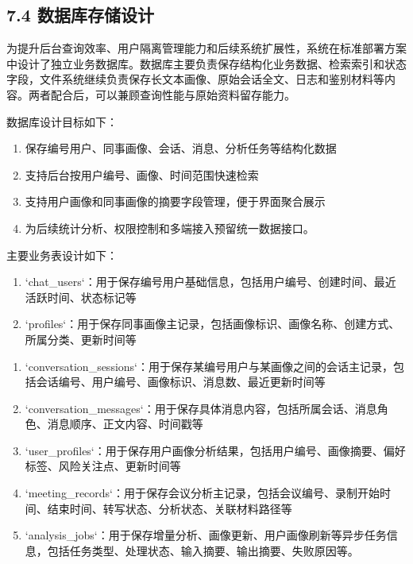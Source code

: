 \documentclass[12pt,a4paper]{article}
\begin{document}
\subsection*{7.4 数据库存储设计}
\vspace{0.45em}
为提升后台查询效率、用户隔离管理能力和后续系统扩展性，系统在标准部署方案中设计了独立业务数据库。数据库主要负责保存结构化业务数据、检索索引和状态字段，文件系统继续负责保存长文本画像、原始会话全文、日志和鉴别材料等内容。两者配合后，可以兼顾查询性能与原始资料留存能力。\par
\vspace{0.45em}
数据库设计目标如下：\par
\vspace{0.45em}
\begin{enumerate}
\item 保存编号用户、同事画像、会话、消息、分析任务等结构化数据
\item 支持后台按用户编号、画像、时间范围快速检索
\item 支持用户画像和同事画像的摘要字段管理，便于界面聚合展示
\item 为后续统计分析、权限控制和多端接入预留统一数据接口。
\end{enumerate}
\vspace{0.45em}
主要业务表设计如下：\par
\vspace{0.45em}
\begin{enumerate}
\item `chat\_users`：用于保存编号用户基础信息，包括用户编号、创建时间、最近活跃时间、状态标记等
\item `profiles`：用于保存同事画像主记录，包括画像标识、画像名称、创建方式、所属分类、更新时间等
\end{enumerate}
\newpage
{}
\fancyhead[R]{}
\begin{enumerate}
\item `conversation\_sessions`：用于保存某编号用户与某画像之间的会话主记录，包括会话编号、用户编号、画像标识、消息数、最近更新时间等
\item `conversation\_messages`：用于保存具体消息内容，包括所属会话、消息角色、消息顺序、正文内容、时间戳等
\item `user\_profiles`：用于保存用户画像分析结果，包括用户编号、画像摘要、偏好标签、风险关注点、更新时间等
\item `meeting\_records`：用于保存会议分析主记录，包括会议编号、录制开始时间、结束时间、转写状态、分析状态、关联材料路径等
\item `analysis\_jobs`：用于保存增量分析、画像更新、用户画像刷新等异步任务信息，包括任务类型、处理状态、输入摘要、输出摘要、失败原因等。
\end{enumerate}
\end{document}
